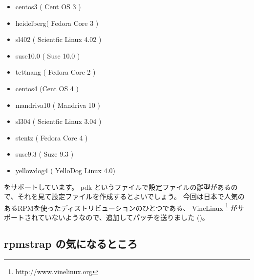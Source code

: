 \documentclass[mingoth,a4paper]{jsarticle}
\begin{document}
\begin{itemize}
\item centos3 ( Cent OS 3 )
\item heidelberg( Fedora Core 3 )  
\item sl402 ( Scientfic Linux 4.02 )       
\item suse10.0  ( Suse 10.0 )
\item tettnang ( Fedora Core 2 )
\item centos4  (Cent OS 4 )   
\item mandriva10 ( Mandriva 10 )
\item sl304  ( Scientfic Linux 3.04 )    
\item stentz ( Fedora Core 4 )  
\item suse9.3  ( Suze 9.3 )   
\item yellowdog4 ( YelloDog Linux 4.0)
\end{itemize}

をサポートしています。
pdk というファイルで設定ファイルの雛型があるので、それを見て設定ファイルを作成するとよいでしょう。
今回は日本で人気のあるRPMを使ったディストリビューションのひとつである、 VineLinux \footnote{http://www.vinelinux.org} 
がサポートされていないようなので、追加してパッチを送りました ()。

\subsection{rpmstrap の気になるところ}
\end{document}
